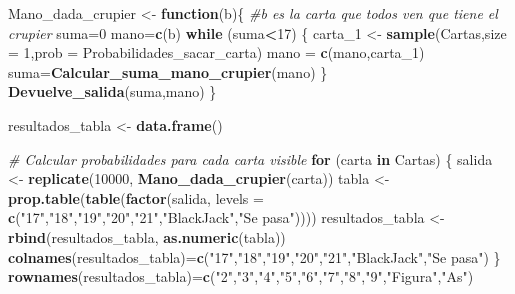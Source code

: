 \documentclass[12pt,a4paper,]{book}
\newenvironment{Shaded}{\begin{snugshade}}{\end{snugshade}}
\newcommand{\AttributeTok}[1]{\textcolor[rgb]{0.13,0.29,0.53}{#1}}
\newcommand{\CommentTok}[1]{\textcolor[rgb]{0.56,0.35,0.01}{\textit{#1}}}
\newcommand{\ControlFlowTok}[1]{\textcolor[rgb]{0.13,0.29,0.53}{\textbf{#1}}}
\newcommand{\DecValTok}[1]{\textcolor[rgb]{0.00,0.00,0.81}{#1}}
\newcommand{\FunctionTok}[1]{\textcolor[rgb]{0.13,0.29,0.53}{\textbf{#1}}}
\newcommand{\NormalTok}[1]{#1}
\newcommand{\OtherTok}[1]{\textcolor[rgb]{0.56,0.35,0.01}{#1}}
\newcommand{\SpecialCharTok}[1]{\textcolor[rgb]{0.81,0.36,0.00}{\textbf{#1}}}
\newcommand{\StringTok}[1]{\textcolor[rgb]{0.31,0.60,0.02}{#1}}
\numberwithin{dummy}{section}
\theoremstyle{ocrenumbox}
\theoremstyle{blacknumex}
\theoremstyle{blacknumbox}
\theoremstyle{ocrenum}
\theoremstyle{ocrenum}
\begin{document}
\begin{Shaded}
\begin{Highlighting}[]
\NormalTok{Mano\_dada\_crupier }\OtherTok{\textless{}{-}} \ControlFlowTok{function}\NormalTok{(b)\{ }\CommentTok{\#b es la carta que todos ven que tiene el crupier}
\NormalTok{  suma}\OtherTok{=}\DecValTok{0}
\NormalTok{  mano}\OtherTok{=}\FunctionTok{c}\NormalTok{(b)}
  \ControlFlowTok{while}\NormalTok{ (suma}\SpecialCharTok{\textless{}}\DecValTok{17}\NormalTok{) \{}
\NormalTok{    carta\_1 }\OtherTok{\textless{}{-}} \FunctionTok{sample}\NormalTok{(Cartas,}\AttributeTok{size =} \DecValTok{1}\NormalTok{,}\AttributeTok{prob =}\NormalTok{ Probabilidades\_sacar\_carta)  }
\NormalTok{    mano }\OtherTok{=} \FunctionTok{c}\NormalTok{(mano,carta\_1)}
\NormalTok{    suma}\OtherTok{=}\FunctionTok{Calcular\_suma\_mano\_crupier}\NormalTok{(mano)}
\NormalTok{  \}}
  \FunctionTok{Devuelve\_salida}\NormalTok{(suma,mano)}
\NormalTok{\}}

\NormalTok{resultados\_tabla }\OtherTok{\textless{}{-}} \FunctionTok{data.frame}\NormalTok{()}

\CommentTok{\# Calcular probabilidades para cada carta visible}
\ControlFlowTok{for}\NormalTok{ (carta }\ControlFlowTok{in}\NormalTok{ Cartas) \{}
\NormalTok{  salida }\OtherTok{\textless{}{-}} \FunctionTok{replicate}\NormalTok{(}\DecValTok{10000}\NormalTok{, }\FunctionTok{Mano\_dada\_crupier}\NormalTok{(carta))}
\NormalTok{  tabla }\OtherTok{\textless{}{-}} \FunctionTok{prop.table}\NormalTok{(}\FunctionTok{table}\NormalTok{(}\FunctionTok{factor}\NormalTok{(salida, }
                                   \AttributeTok{levels =} \FunctionTok{c}\NormalTok{(}\StringTok{"17"}\NormalTok{,}\StringTok{"18"}\NormalTok{,}\StringTok{"19"}\NormalTok{,}\StringTok{"20"}\NormalTok{,}\StringTok{"21"}\NormalTok{,}\StringTok{"BlackJack"}\NormalTok{,}\StringTok{"Se pasa"}\NormalTok{))))}
\NormalTok{  resultados\_tabla }\OtherTok{\textless{}{-}} \FunctionTok{rbind}\NormalTok{(resultados\_tabla, }\FunctionTok{as.numeric}\NormalTok{(tabla))}
  \FunctionTok{colnames}\NormalTok{(resultados\_tabla)}\OtherTok{=}\FunctionTok{c}\NormalTok{(}\StringTok{"17"}\NormalTok{,}\StringTok{"18"}\NormalTok{,}\StringTok{"19"}\NormalTok{,}\StringTok{"20"}\NormalTok{,}\StringTok{"21"}\NormalTok{,}\StringTok{"BlackJack"}\NormalTok{,}\StringTok{"Se pasa"}\NormalTok{)}
\NormalTok{\}}
\FunctionTok{rownames}\NormalTok{(resultados\_tabla)}\OtherTok{=}\FunctionTok{c}\NormalTok{(}\StringTok{"2"}\NormalTok{,}\StringTok{"3"}\NormalTok{,}\StringTok{"4"}\NormalTok{,}\StringTok{"5"}\NormalTok{,}\StringTok{"6"}\NormalTok{,}\StringTok{"7"}\NormalTok{,}\StringTok{"8"}\NormalTok{,}\StringTok{"9"}\NormalTok{,}\StringTok{"Figura"}\NormalTok{,}\StringTok{"As"}\NormalTok{)}



\end{Highlighting}
\end{Shaded}
\end{document}
